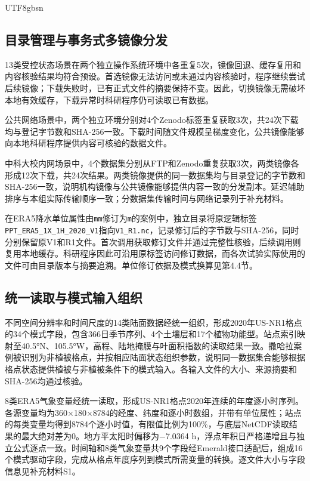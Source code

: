 \documentclass[numdoi]{chinese}
\begin{document}
\begin{CJK}{UTF8}{gbsn}
\subsection{目录管理与事务式多镜像分发}
13类受控状态场景在两个独立操作系统环境中各重复5次，镜像回退、缓存复用和内容核验结果均符合预设。首选镜像无法访问或未通过内容核验时，程序继续尝试后续镜像；下载失败时，已有正式文件的摘要保持不变。因此，切换镜像无需破坏本地有效缓存，下载异常时科研程序仍可读取已有数据。

公共网络场景中，两个独立环境分别对4个Zenodo标签重复获取3次，共24次下载均与登记字节数和SHA-256一致。下载时间随文件规模呈梯度变化，公共镜像能够向本地科研程序提供内容可核验的数据文件。

中科大校内网场景中，4个数据集分别从FTP和Zenodo重复获取3次，两类镜像各形成12次下载，共24次结果。两类镜像提供的同一数据集均与目录登记的字节数和SHA-256一致，说明机构镜像与公共镜像能够提供内容一致的分发副本。延迟辅助排序与本组实际传输顺序一致；分数据集传输时间与网络记录列于补充材料。

在ERA5降水单位属性由\nolinkurl{mm}修订为\nolinkurl{m}的案例中，独立目录将原逻辑标签\nolinkurl{PPT_ERA5_1X_1H_2020_V1}指向\nolinkurl{V1_R1.nc}，记录修订后的字节数与SHA-256，同时分别保留原V1和R1文件。首次调用获取修订文件并通过完整性核验，后续调用则复用本地缓存。科研程序因此可沿用原标签访问修订数据，而各次试验实际使用的文件可由目录版本与摘要追溯。单位修订依据及模式换算见第4.4节。

\subsection{统一读取与模式输入组织}
不同空间分辨率和时间尺度的14类陆面数据经统一组织，形成2020年US-NR1格点的34个模式字段，包含366日季节序列、4个土壤层和17个植物功能型。站点索引映射至40.5°N、105.5°W，高程、陆地掩膜与叶面积指数的读取结果一致。撒哈拉案例被识别为非植被格点，并按相应陆面状态组织参数，说明同一数据集合能够根据格点状态提供植被与非植被条件下的模式输入。各输入文件的大小、来源摘要和SHA-256均通过核验。

8类ERA5气象变量经统一读取，形成US-NR1格点2020年连续的年度逐小时序列。各源变量均为360\ensuremath{\times}180\ensuremath{\times}8784的经度、纬度和逐小时数组，并带有单位属性；站点的每类变量均得到8784个逐小时值，有限值比例为100\%，与底层NetCDF读取结果的最大绝对差为0。地方平太阳时偏移为\ensuremath{-}7.0364 h，浮点年积日严格递增且与独立公式逐点一致。时间轴和8类气象变量共9个字段经Emerald接口适配后，组成16个模式驱动字段，完成从格点年度序列到模式所需变量的转换。逐文件大小与字段信息见补充材料S1。


\end{CJK}
\end{document}
